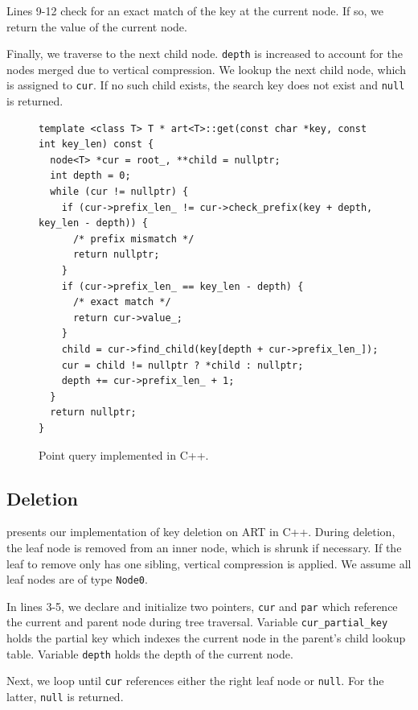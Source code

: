 \documentclass[abstracton,12pt]{scrartcl}
\theoremstyle{definition}
\begin{document}
Lines 9-12 check for an exact match of the key at the current node. If so,
we return the value of the current node.

Finally, we traverse to the next child node. \texttt{depth} is increased to
account for the nodes merged due to vertical compression.
We lookup the next child node, which is assigned to \texttt{cur}.
If no such child exists, the search key does not exist and \texttt{null} is
returned.

\begin{figure}[H]
  \begin{verbatim}
template <class T> T * art<T>::get(const char *key, const int key_len) const {
  node<T> *cur = root_, **child = nullptr;
  int depth = 0;
  while (cur != nullptr) {
    if (cur->prefix_len_ != cur->check_prefix(key + depth, key_len - depth)) {
      /* prefix mismatch */
      return nullptr;
    }
    if (cur->prefix_len_ == key_len - depth) {
      /* exact match */
      return cur->value_;
    }
    child = cur->find_child(key[depth + cur->prefix_len_]);
    cur = child != nullptr ? *child : nullptr;
    depth += cur->prefix_len_ + 1;
  }
  return nullptr;
}
  \end{verbatim}
  \vspace{-5mm}
  \caption{Point query implemented in C++.}
  \label{algo:point-query}
\end{figure}

\subsection{Deletion}\label{sec:deletion}

 presents our implementation of key deletion on ART in C++.
During deletion, the leaf node is removed from an inner node, which is shrunk
if necessary. If the leaf to remove only has one sibling, vertical
compression is applied. We assume all leaf nodes are of type \texttt{Node0}.

In lines 3-5, we declare and initialize two pointers, \texttt{cur} and
\texttt{par} which reference the current and parent node during tree traversal.
Variable \texttt{cur\_partial\_key} holds the partial key which indexes the
current node in the parent's child lookup table.
Variable \texttt{depth} holds the depth of the current node.

Next, we loop until \texttt{cur} references either the right leaf node or
\texttt{null}. For the latter, \texttt{null} is returned.
\end{document}
